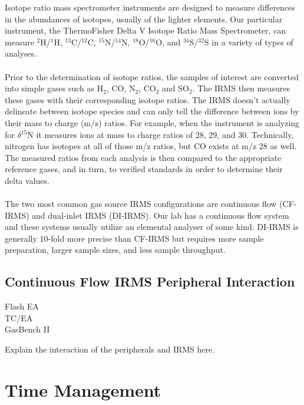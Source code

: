 \documentclass[12pt]{../SOP4_alpha}\usepackage[]{graphicx}\usepackage[]{color}
\begin{document}
\NP Isotope ratio mass spectrometer instruments are designed to measure differences in the abundances of isotopes, usually of the lighter elements. Our particular instrument, the ThermoFisher Delta V Isotope Ratio Mass Spectrometer, can measure $^{2}$H/$^{1}$H, $^{13}$C/$^{12}$C, $^{15}$N/$^{14}$N, $^{18}$O/$^{16}$O, and $^{34}$S/$^{32}$S in a variety of types of analyses.
\\
\\
Prior to the determination of isotope ratios, the samples of interest are converted into simple gases such as H$_2$, CO, N$_2$, CO$_2$ and SO$_2$. The IRMS then measures these gases with their corresponding isotope ratios. The IRMS doesn't actually delineate between isotope species and can only tell the difference between ions by their mass to charge (m/z) ratios. For example, when the instrument is analyzing for $\delta$$^{15}$N it measures ions at mass to charge ratios of 28, 29, and 30. Technically, nitrogen has isotopes at all of  those m/z ratios, but CO exists at m/z 28 as well. The measured ratios from each analysis is then compared to the appropriate reference gases, and in turn, to verified standards in order to determine their delta values.\\
\\
The two most common gas source IRMS configurations are continuous flow (CF-IRMS) and dual-inlet IRMS (DI-IRMS). Our lab has a continuous flow system and these systems usually utilize an elemental analyser of some kind. DI-IRMS is generally 10-fold more precise than CF-IRMS but requires more sample preparation, larger sample sizes, and less sample throughput.

\subsection{Continuous Flow IRMS Peripheral Interaction}

\begin{description}

\item[Flash EA]

\item[TC/EA]

\item[GasBench II]

\end{description}

\NP Explain the interaction of the peripherals and IRMS here.

\section{Time Management}
\end{document}
